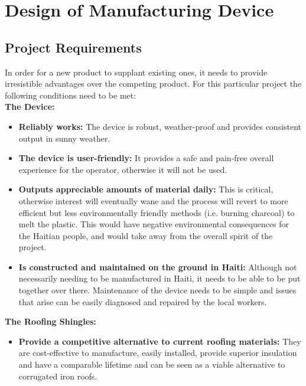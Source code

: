 \documentclass[11pt,english]{article}
\begin{document}
\section{Design of Manufacturing Device}
\subsection{Project Requirements}
In order for a new product to supplant existing ones, it needs to provide irresistible advantages over the competing product. For this particular project the following conditions need to be met:\\
\textbf{ The Device:}
\begin {itemize}

\item \textbf{Reliably works:} The device is robust, weather-proof and provides consistent output in sunny weather. 
\item \textbf{The device is user-friendly:} It provides a safe and pain-free overall experience for the operator, otherwise it will not be used. 
\item \textbf{Outputs appreciable amounts of material daily:} This is critical, otherwise interest will eventually wane and the process will revert to more efficient but less environmentally friendly methods (i.e. burning charcoal) to melt the plastic. This would have negative environmental consequences for the Haitian people, and would take away from the overall spirit of the project.  
\item \textbf{Is constructed and maintained on the ground in Haiti:} Although not necessarily needing to be manufactured in Haiti, it needs to be able to be put together over there. Maintenance of the device needs to be simple and issues that arise can be easily diagnosed and repaired by the local workers. 

\end{itemize}
\textbf{The Roofing Shingles:}
\begin{itemize}

\item \textbf{Provide a competitive alternative to current roofing materials:} They are cost-effective to manufacture, easily installed, provide superior insulation and have a comparable lifetime and can be seen as a viable alternative to corrugated iron roofs. 
\end{itemize}
\end{document}
